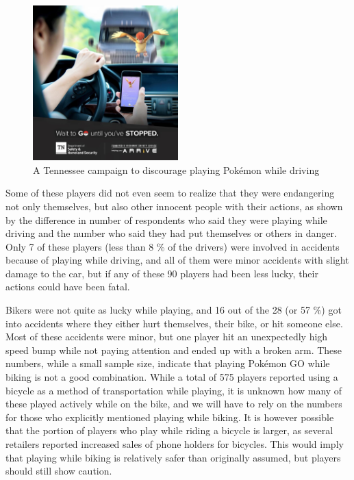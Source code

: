 \begin{figure}[h]
	\centering
	\includegraphics[width=0.5\textwidth]{Figures/pogo-and-driving}
	\caption{A Tennessee campaign to discourage playing Pokémon while driving}
	\label{fig:tennessee-pogo-driving}
\end{figure}

Some of these players did not even seem to realize that they were endangering not only themselves, but also other innocent people with their actions, as shown by the difference in number of respondents who said they were playing while driving and the number who said they had put themselves or others in danger. Only 7 of these players (less than 8 \% of the drivers) were involved in accidents because of playing while driving, and all of them were minor accidents with slight damage to the car, but if any of these 90 players had been less lucky, their actions could have been fatal.

Bikers were not quite as lucky while playing, and 16 out of the 28 (or 57 \%) got into accidents where they either hurt themselves, their bike, or hit someone else. Most of these accidents were minor, but one player hit an unexpectedly high speed bump while not paying attention and ended up with a broken arm. These numbers, while a small sample size, indicate that playing Pokémon GO while biking is not a good combination. While a total of 575 players reported using a bicycle as a method of transportation while playing, it is unknown how many of these played actively while on the bike, and we will have to rely on the numbers for those who explicitly mentioned playing while biking. It is however possible that the portion of players who play while riding a bicycle is larger, as several retailers reported increased sales of phone holders for bicycles. This would imply that playing while biking is relatively safer than originally assumed, but players should still show caution.

